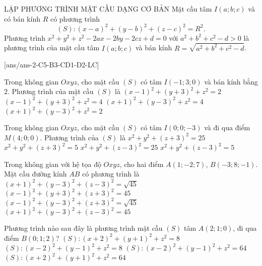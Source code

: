 \begin{dang}{LẬP PHƯƠNG TRÌNH MẶT CẦU DẠNG CƠ BẢN}
	Mặt cầu tâm $I(a;b;c)$ và có bán kính $R$ có phương trình $$(S)\colon{(x-a)^2}+(y-b)^2+(z-c)^2=R^2.$$	
	Phương trình $x^2+y^2+z^2-2ax-2by-2cz+d=0$ với $a^2+b^2+c^2-d>0$ là phương trình của mặt cầu tâm $I(a;b;c)$ và bán kính $R=\sqrt{a^2+b^2+c^2-d}$.	
\end{dang}
\TN
{}[ans/ans-2-C5-B3-CD1-D2-LC]
\begin{ex}%
	Trong không gian $Oxyz$, cho mặt cầu $(S)$ có tâm $I(-1;3;0)$ và bán kính bằng $2$. Phương trình của mặt cầu $(S)$ là
	\choice
	{$(x-1)^2+(y+3)^2+z^2=2$}
	{$(x-1)^2+(y+3)^2+z^2=4$}
	{\True $(x+1)^2+(y-3)^2+z^2=4$}
	{$(x+1)^2+(y-3)^2+z^2=2$}
\end{ex}

\begin{ex}%
	Trong không gian $Oxyz$, cho mặt cầu $(S)$ có tâm $I(0;0;-3)$ và đi qua điểm $M(4;0;0)$. Phương trình của $(S)$ là
	\choice
	{\True $x^2+y^2+(z+3)^2=25$}
	{$x^2+y^2+(z+3)^2=5$}
	{$x^2+y^2+(z-3)^2=25$}
	{$x^2+y^2+(z-3)^2=5$}
\end{ex}

\begin{ex}%
	Trong không gian với hệ tọa độ $Oxyz$, cho hai điểm $A(1;-2;7)$, $B(-3;8;-1)$. Mặt cầu đường kính $AB$ có phương trình là
	\choice
	{$(x+1)^2+(y-3)^2+(z-3)^2=\sqrt{45}$}
	{$(x-1)^2+(y+3)^2+(z+3)^2=45$}
	{$(x-1)^2+(y-3)^2+(z+3)^2=\sqrt{45}$}
	{\True $(x+1)^2+(y-3)^2+(z-3)^2=45$}
\end{ex}

\begin{ex}%
	Phương trình nào sau đây là phương trình mặt cầu $(S)$ tâm $A(2;1;0)$, đi qua điểm $B(0;1;2)$?
	\choice
	{$(S)\colon{(x+2)^2}+(y+1)^2+z^2=8$}
	{\True $(S)\colon{(x-2)^2}+(y-1)^2+z^2=8$}
	{$(S)\colon{(x-2)^2}+(y-1)^2+z^2=64$}
	{$(S)\colon{(x+2)^2}+(y+1)^2+z^2=64$}
\end{ex}

